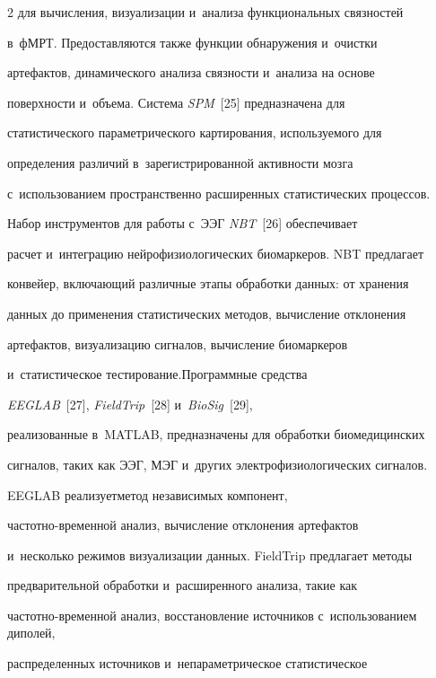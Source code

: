 \begin{multicols}{2}
для вычисления, визуализации и~ана\-ли\-за функциональных связностей 


в~\mbox{фМРТ}. Пред\-остав\-ля\-ют\-ся также функции обнаружения и~очистки 


артефактов, динамического анализа связности и~анализа на основе 


по\-верх\-ности и~\mbox{объема}. Сис\-те\-ма \textit{SPM}~[25] предназначена для 


статистического параметрического картирования, используемого для 


определения различий в~зарегистрированной активности мозга 


с~использованием пространственно расширенных статистических процессов.


    


    Набор инструментов для работы с~ЭЭГ \textit{NBT}~[26] обеспечивает 


расчет и~интеграцию ней\-ро\-фи\-зио\-логических биомаркеров. NBT предлагает 


конвей\-ер, включающий различные этапы обработки данных: от хранения 


данных до применения статистических методов, вычисление отклонения 


\mbox{артефактов}, визуализацию сигналов, вычисление биомаркеров 


и~статистическое тестирование.\linebreak Программные средства 


\textit{EEGLAB}~[27], \textit{FieldTrip}~[28] и~\textit{BioSig}~[29], 


реализованные в~MATLAB, предназначены для обработки биомедицинских 


сигналов, таких как ЭЭГ, МЭГ и~других электрофизиологических сигналов. 


EEGLAB реализует\linebreak метод независимых компонент,  


час\-тот\-но-вре\-мен\-ной анализ, вычисление отклонения артефактов 


и~несколько режимов визуализации данных. \mbox{FieldTrip} предлагает методы 


предварительной об\-работки и~расширенного анализа, такие как 


час\-тот\-но-вре\-мен\-ной анализ, восстановление источников с~использованием диполей, 


распределенных источников и~непараметрическое статистическое 



\end{multicols}
